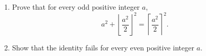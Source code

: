 \begin{enumerate}
\item[(a)] Prove that for every odd positive integer \(a\),
\[
a^2+\left\lfloor\dfrac{a^2}{2}\right\rfloor^2=\left\lceil\dfrac{a^2}{2}\right\rceil^2.
\]
\item[(b)] Show that the identity fails for every even positive integer \(a\).
\end{enumerate}
